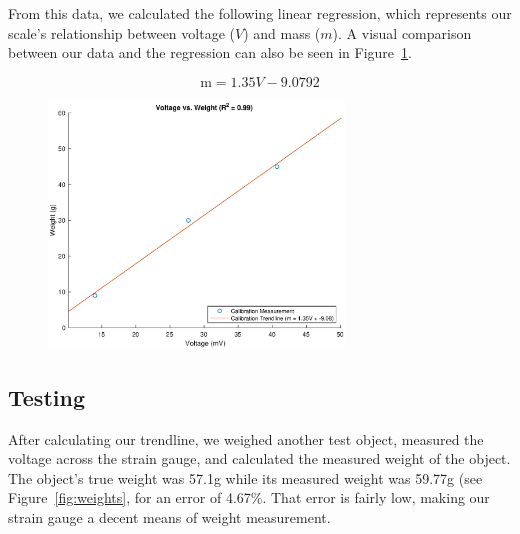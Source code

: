 \documentclass[11pt]{article}
\begin{document}
From this data, we calculated the following linear regression, which represents our scale's relationship between voltage ($V$) and mass ($m$). A visual comparison between our data and the regression can also be seen in Figure~\ref{fig:calibration}.

\begin{equation}
    \text{m} = 1.35V - 9.0792
\end{equation}

\begin{figure}[!ht]
	\centering 
	\includegraphics[width=0.7\textwidth]{calibration.eps}
	\caption{}
	\label{fig:calibration}
\end{figure}

\subsection{Testing}

After calculating our trendline, we weighed another test object, measured the voltage across the strain gauge, and calculated the measured weight of the object. The object's true weight was 57.1g while its measured weight was 59.77g (see Figure~\ref{fig:weights}, for an error of 4.67\%. That error is fairly low, making our strain gauge a decent means of weight measurement.
\end{document}

